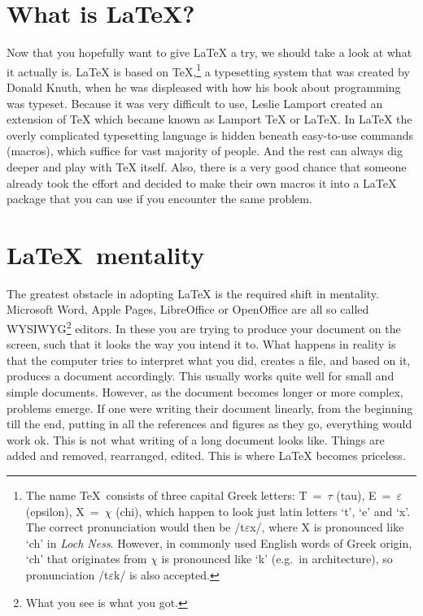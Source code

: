 \documentclass[11pt]{article}
\begin{document}
\section{What is \LaTeX?}
Now that you hopefully want to give LaTeX a try, we should take a look at what it actually is. LaTeX is based on \TeX,\footnote{The name \TeX\ consists of three capital Greek letters: T~=~$\tau$ (tau), E~=~$\varepsilon$ (epsilon), X~=~$\chi$ (chi), which happen to look just latin letters `t', `e' and `x'. The correct pronunciation would then be /t$\varepsilon$x/, where X is pronounced like `ch' in \emph{Loch Ness}. However, in commonly used English words of Greek origin, `ch' that originates from $\chi$ is pronounced like `k' (e.g.~in architecture), so pronunciation /t$\varepsilon$k/ is also accepted.} a typesetting system that was created by Donald Knuth, when he was displeased with how his book about programming was typeset. Because it was very difficult to use, Leslie Lamport created an extension of TeX which became known as Lamport TeX or LaTeX. In LaTeX the overly complicated typesetting language is hidden beneath easy-to-use commands (macros), which suffice for vast majority of people. And the rest can always dig deeper and play with TeX itself. Also, there is a very good chance that someone already took the effort and decided to make their own macros it into a LaTeX package that you can use if you encounter the same problem.

\section{\LaTeX\ mentality}
The greatest obstacle in adopting LaTeX is the required shift in mentality. Microsoft Word, Apple Pages, LibreOffice or OpenOffice are all so called WYSIWYG\footnote[3]{What you see is what you got.} editors. In these you are trying to produce your document on the screen, such that it looks the way you intend it to. What happens in reality is that the computer tries to interpret what you did, creates a file, and based on it, produces a document accordingly. This usually works quite well for small and simple documents. However, as the document becomes longer or more complex, problems emerge. If one were writing their document linearly, from the beginning till the end, putting in all the references and figures as they go, everything would work ok. This is not what writing of a long document looks like. Things are added and removed, rearranged, edited. This is where LaTeX becomes priceless.
\end{document}

